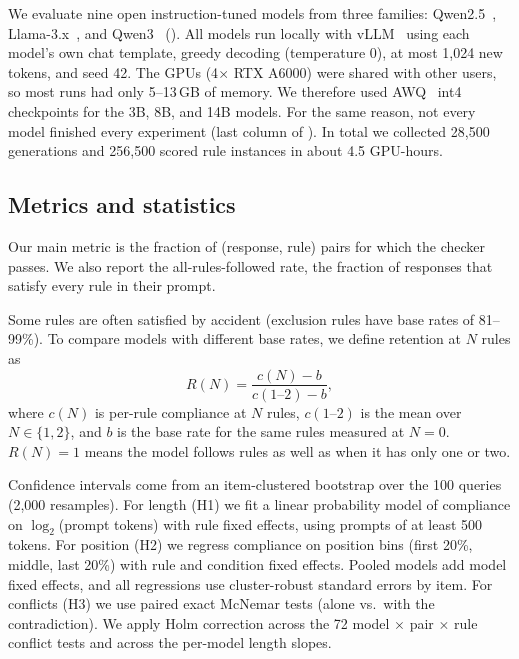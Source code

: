 We evaluate nine open instruction-tuned models from three families: Qwen2.5~\cite{qwen2025qwen25}, Llama-3.x~\cite{dubey2024llama3}, and Qwen3~\cite{yang2025qwen3} ().
All models run locally with vLLM~\cite{kwon2023vllm} using each model's own chat template, greedy decoding (temperature 0), at most 1{,}024 new tokens, and seed 42.
The GPUs (4$\times$ RTX A6000) were shared with other users, so most runs had only 5--13\,GB of memory.
We therefore used AWQ~\cite{lin2024awq} int4 checkpoints for the 3B, 8B, and 14B models.
For the same reason, not every model finished every experiment (last column of ).
In total we collected 28{,}500 generations and 256{,}500 scored rule instances in about 4.5 GPU-hours.

\subsection{Metrics and statistics}

Our main metric is the fraction of (response, rule) pairs for which the checker passes.
We also report the all-rules-followed rate, the fraction of responses that satisfy every rule in their prompt.

Some rules are often satisfied by accident (\eg exclusion rules have base rates of 81--99\%).
To compare models with different base rates, we define retention at $N$ rules as
\begin{equation}
    R(N) = \frac{c(N) - b}{c(1\text{--}2) - b},
\end{equation}
where $c(N)$ is per-rule compliance at $N$ rules, $c(1\text{--}2)$ is the mean over $N \in \{1, 2\}$, and $b$ is the base rate for the same rules measured at $N{=}0$.
$R(N){=}1$ means the model follows rules as well as when it has only one or two.

Confidence intervals come from an item-clustered bootstrap over the 100 queries (2{,}000 resamples).
For length (H1) we fit a linear probability model of compliance on $\log_2$(prompt tokens) with rule fixed effects, using prompts of at least 500 tokens.
For position (H2) we regress compliance on position bins (first 20\%, middle, last 20\%) with rule and condition fixed effects.
Pooled models add model fixed effects, and all regressions use cluster-robust standard errors by item.
For conflicts (H3) we use paired exact McNemar tests (alone vs.\ with the contradiction).
We apply Holm correction across the 72 model $\times$ pair $\times$ rule conflict tests and across the per-model length slopes.
